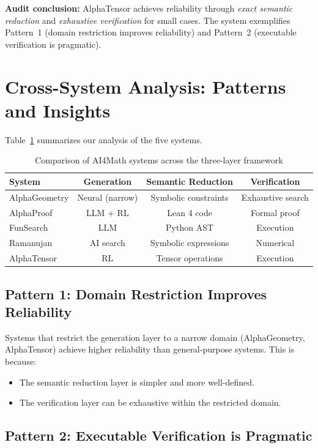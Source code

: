 \documentclass[11pt,a4paper]{article}
\begin{document}
\textbf{Audit conclusion:} AlphaTensor achieves reliability through \emph{exact semantic reduction} and \emph{exhaustive verification} for small cases. The system exemplifies Pattern~1 (domain restriction improves reliability) and Pattern~2 (executable verification is pragmatic).

\section{Cross-System Analysis: Patterns and Insights}
\label{sec:analysis}

Table~\ref{tab:comparison} summarizes our analysis of the five systems.

\begin{table}[ht]
\centering
\caption{Comparison of AI4Math systems across the three-layer framework}
\label{tab:comparison}
\begin{tabular}{lccc}
\toprule
\textbf{System} & \textbf{Generation} & \textbf{Semantic Reduction} & \textbf{Verification} \\
\midrule
AlphaGeometry & Neural (narrow) & Symbolic constraints & Exhaustive search \\
AlphaProof & LLM + RL & Lean 4 code & Formal proof \\
FunSearch & LLM & Python AST & Execution \\
Ramanujan & AI search & Symbolic expressions & Numerical \\
AlphaTensor & RL & Tensor operations & Execution \\
\bottomrule
\end{tabular}
\end{table}

\subsection{Pattern 1: Domain Restriction Improves Reliability}

Systems that restrict the generation layer to a narrow domain (AlphaGeometry, AlphaTensor) achieve higher reliability than general-purpose systems. This is because:
\begin{itemize}
  \item The semantic reduction layer is simpler and more well-defined.
  \item The verification layer can be exhaustive within the restricted domain.
\end{itemize}

\subsection{Pattern 2: Executable Verification is Pragmatic}
\end{document}

